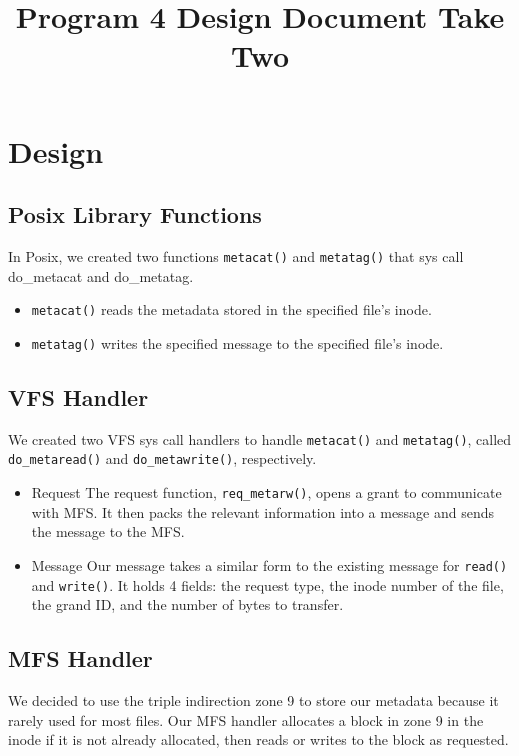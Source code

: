 \documentclass[10pt]{article}
\title{Program 4 Design Document Take Two}
\begin{document}
 

\section*{}

\section*{Design}

\subsection*{Posix Library Functions}

In Posix, we created two functions {\tt metacat()} and {\tt metatag()} that sys call do_metacat and do_metatag.
\begin {itemize}
\item {\tt metacat()} reads the metadata stored in the specified file's inode. 
\item {\tt metatag()} writes the specified message to the specified file's inode. 
\end{itemize}

\subsection*{VFS Handler}

We created two VFS sys call handlers to handle {\tt metacat()} and {\tt metatag()}, called {\tt do\_metaread()} and {\tt do\_metawrite()}, respectively.

\begin{itemize}
\item{Request} The request function, {\tt req\_metarw()}, opens a grant to communicate with MFS. It then packs the relevant information into a message and sends the message to the MFS.
\item{Message} Our message takes a similar form to the existing message for {\tt read()} and {\tt write()}. It holds 4 fields: the request type, the inode number of the file, the grand ID, and the number of bytes to transfer.
\end{itemize}

\subsection*{MFS Handler}
We decided to use the triple indirection zone 9 to store our metadata because it rarely used for most files. Our MFS handler allocates a block in zone 9 in the inode if it is not already allocated, then reads or writes to the block as requested.
\end{document}
